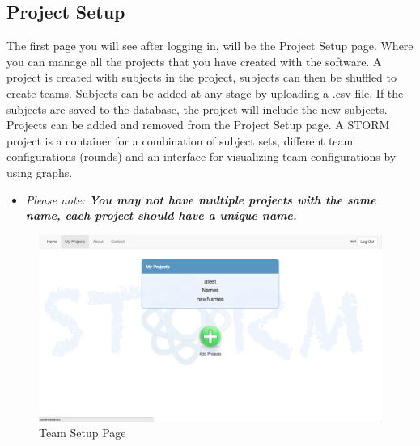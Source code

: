 \subsection{Project Setup}\par
The first page you will see after logging in, will be the Project Setup page.  Where you can manage all the projects that you have created with the software. A project is created with subjects in the project, subjects can then be shuffled to create teams. Subjects can be added at any stage by uploading a .csv file. If the subjects are saved to the database, the project will include the new subjects. Projects can be added and removed from the Project Setup page. A STORM project is a container for a combination of subject sets, different team configurations (rounds) and an interface for visualizing team configurations by using graphs.\par
\begin{itemize}
	\item[] \textit{Please note: \textbf{You may not have multiple projects with the same name, each project should have a unique name.}}
\end{itemize}
 \begin{figure}[H] 
	\centering
	\includegraphics[width=13cm]{./graphics/TeamSetup.jpg}\par
	\caption{Team Setup Page}
\end{figure}

\newpage

